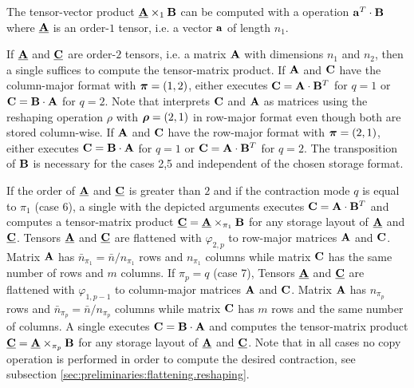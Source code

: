 

The tensor-vector product $\underline{\mathbf{A}} \times_1 \mathbf{B}$ can be computed with a  operation $\mathbf{a}^T \cdot \mathbf{B}$ where $\underline{\mathbf{A}}$ is an order-$1$ tensor, i.e. a vector $\mathbf{a}$ of length $n_1$.

If $\underline{\mathbf{A}}$ and $\underline{\mathbf{C}}$ are order-$2$ tensors, i.e. a matrix $\mathbf{A}$ with dimensions $n_1$ and $n_2$, then a single  suffices to compute the tensor-matrix product. 
If $\mathbf{A}$ and $\mathbf{C}$ have the column-major format with $\boldsymbol{\pi}=(1,2)$,  either executes $\mathbf{C} = \mathbf{A} \cdot \mathbf{B}^T$ for $q =1$ or $\mathbf{C} = \mathbf{B} \cdot \mathbf{A}$ for $q=2$.
Note that  interprets $\mathbf{C}$ and $\mathbf{A}$ as matrices using the reshaping operation $\rho$ with $\boldsymbol{\rho} = (2,1)$ in row-major format even though both are stored column-wise.
If $\mathbf{A}$ and $\mathbf{C}$ have the row-major format with $\boldsymbol{\pi}=(2,1)$,  either executes $\mathbf{C} = \mathbf{B} \cdot \mathbf{A}$ for $q =1$ or $\mathbf{C} = \mathbf{A} \cdot \mathbf{B}^T$ for $q=2$. 
The transposition of $\mathbf{B}$ is necessary for the cases 2,5 and independent of the chosen storage format.

If the order of $\underline{\mathbf{A}}$ and $\underline{\mathbf{C}}$ is greater than $2$ and if the contraction mode $q$ is equal to $\pi_1$ (case 6), a single  with the depicted arguments executes $\mathbf{C} = \mathbf{A} \cdot \mathbf{B}^T$ and computes a tensor-matrix product $\underline{\mathbf{C}} = \underline{\mathbf{A}} \times_{\pi_1} \mathbf{B}$ for any storage layout of $\underline{\mathbf{A}}$ and $\underline{\mathbf{C}}$.
Tensors $\underline{\mathbf{A}}$ and $\underline{\mathbf{C}}$ are flattened with $\varphi_{2,p}$ to row-major matrices $\mathbf{A}$ and $\mathbf{C}$.
Matrix $\mathbf{A}$ has $\bar{n}_{\pi_1} = \bar{n} / n_{\pi_1}$ rows and $n_{\pi_1}$ columns while matrix $\mathbf{C}$ has the same number of rows and $m$ columns.
If $\pi_p=q$ (case 7), Tensors $\underline{\mathbf{A}}$ and $\underline{\mathbf{C}}$ are flattened with $\varphi_{1,p-1}$ to column-major matrices $\mathbf{A}$ and $\mathbf{C}$.
Matrix $\mathbf{A}$ has $n_{\pi_p}$ rows and $\bar{n}_{\pi_p} =  \bar{n} / n_{\pi_p}$ columns while matrix $\mathbf{C}$ has $m$ rows and the same number of columns.
A single  executes $\mathbf{C} = \mathbf{B} \cdot \mathbf{A}$ and computes the tensor-matrix product $\underline{\mathbf{C}} = \underline{\mathbf{A}} \times_{\pi_p} \mathbf{B}$ for any storage layout of $\underline{\mathbf{A}}$ and $\underline{\mathbf{C}}$.
Note that in all cases no copy operation is performed in order to compute the desired contraction, see subsection \ref{sec:preliminaries:flattening.reshaping}.

